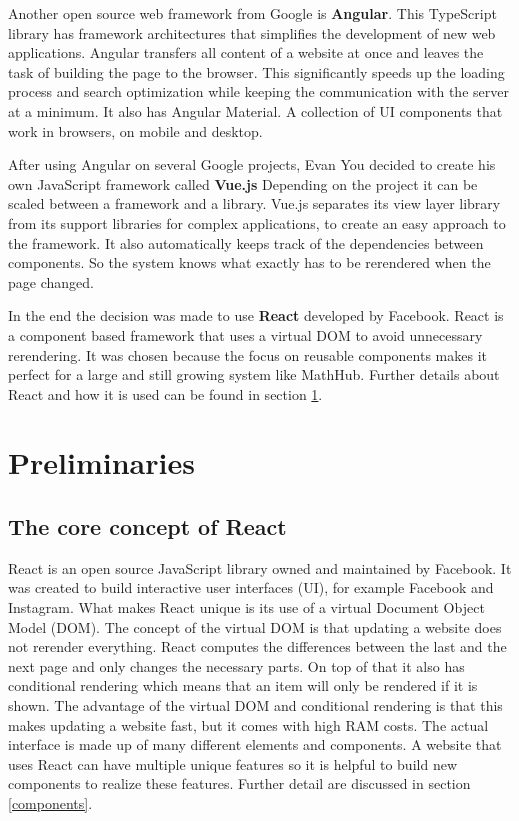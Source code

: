 \documentclass[11pt,a4paper]{article}
\begin{document}
Another open source web framework from Google is \textbf{Angular}. \cite{angular}
This TypeScript library has framework architectures that simplifies the development of new web applications.
Angular transfers all content of a website at once and leaves the task of building the page to the browser.
This significantly speeds up the loading process and search optimization while keeping the communication with the server at a minimum. 
It also has Angular Material.
A collection of UI components that work in browsers, on mobile and desktop.

After using Angular on several Google projects, Evan You decided to create his own JavaScript framework called \textbf{Vue.js} \cite{vuewiki}
Depending on the project it can be scaled between a framework and a library.
Vue.js separates its view layer library from its support libraries for complex applications, to create an easy approach to the framework.
It also automatically keeps track of the dependencies between components.
So the system knows what exactly has to be rerendered when the page changed.\cite{vuegit}

In the end the decision was made to use \textbf{React} developed by Facebook.
React is a component based framework that uses a virtual DOM to avoid unnecessary rerendering.
It was chosen because the focus on reusable components makes it perfect for a large and still growing system like MathHub.
Further details about React and how it is used can be found in section \ref{preliminaries}.


\section{Preliminaries} \label{preliminaries}
\subsection{The core concept of React} \label{react}
React is an open source JavaScript library owned and maintained by Facebook.
It was created to build interactive user interfaces (UI), for example Facebook and Instagram.
What makes React unique is its use of a virtual Document Object Model (DOM).
The concept of the virtual DOM is that updating a website does not rerender everything.
React computes the differences between the last and the next page and only changes the necessary parts.
On top of that it also has conditional rendering which means that an item will only be rendered if it is shown.
The advantage of the virtual DOM and conditional rendering is that this makes updating a website fast, but it comes with high RAM costs.
The actual interface is made up of many different elements and components.
A website that uses React can have multiple unique features so it is helpful to build new components to realize these features.\cite{reactjs}
Further detail are discussed in section \ref{components}.
\end{document}
